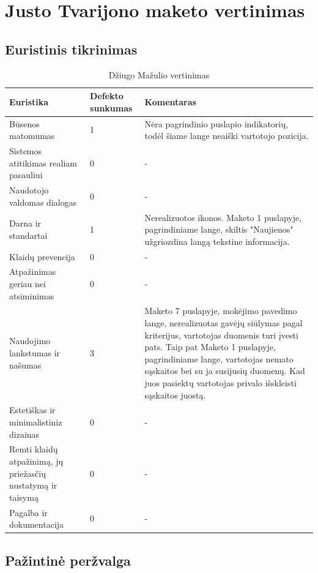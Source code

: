 \documentclass[oneside]{VUMIFPSkursinis}
\begin{document}
\section{Justo Tvarijono maketo vertinimas}
\subsection{Euristinis tikrinimas}
\begin{center}
\begin{longtable}[!htb]{|p{3.5cm}|p{1.9cm}|p{9.6cm}|}
	\caption{Džiugo Mažulio vertinimas}
	\endfirsthead
	\endhead
  \hline
	Euristika & Defekto sunkumas & Komentaras \\ \hline
	Būsenos matomumas & 1 & Nėra pagrindinio puslapio indikatorių, todėl šiame lange neaiški vartotojo pozicija. \\ \hline
	Sistemos atitikimas realiam pasauliui & 0 & - \\ \hline
	Naudotojo valdomas dialogas & 0 & - \\ \hline
	Darna ir standartai & 1 & Nerealizuotos ikonos. Maketo 1 puslapyje, pagrindiniame lange, skiltis "Naujienos" užgriozdina langą tekstine informacija. \\ \hline
	Klaidų prevencija & 0 & - \\ \hline
	Atpažinimas geriau nei atsiminimas & 0 & - \\ \hline
	Naudojimo lankstumas ir našumas & 3 & Maketo 7 puslapyje, mokėjimo pavedimo lange, nerealizuotas gavėjų siūlymas pagal kriterijus, vartotojas duomenis turi įvesti pats. Taip pat Maketo 1 puslapyje, pagrindiniame lange, vartotojas nemato sąskaitos bei su ja susijusių duomenų. Kad juos pasiektų vartotojas privalo išskleisti sąskaitos juostą. \\ \hline
	Estetiškas ir minimalistiniz dizainas & 0 & - \\ \hline
	Remti klaidų atpažinimą, jų priežasčių nustatymą ir taisymą & 0 & - \\ \hline
	Pagalba ir dokumentacija & 0 & -  \\ \hline
\end{longtable}
\end{center}

\subsection{Pažintinė peržvalga}
\end{document}
